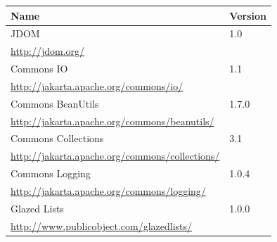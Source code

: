 \begin{table}[H]
 \centering
 \begin{tabular}{|l|l|}
  \hline
   \multicolumn{1}{|p{4.5in}|}{\bfseries{\textsf{Name}}} &
   \multicolumn{1}{|p{0.6in}|}{\bfseries{\textsf{Version}}} \\

  \hline
   \multicolumn{1}{|p{4.5in}|}{JDOM} &
   \multicolumn{1}{|p{0.6in}|}{1.0} \\
   \multicolumn{1}{|p{4.5in}|}{\footnotesize{\href{http://jdom.org/}{http://jdom.org/}}} &
   \multicolumn{1}{|p{0.6in}|}{} \\

  \hline
   \multicolumn{1}{|p{4.5in}|}{Commons IO} &
   \multicolumn{1}{|p{0.6in}|}{1.1} \\
   \multicolumn{1}{|p{4.5in}|}{\footnotesize{\href{http://jakarta.apache.org/commons/io/}{http://jakarta.apache.org/commons/io/}}} &
   \multicolumn{1}{|p{0.6in}|}{} \\

  \hline
   \multicolumn{1}{|p{4.5in}|}{Commons BeanUtils} &
   \multicolumn{1}{|p{0.6in}|}{1.7.0} \\
   \multicolumn{1}{|p{4.5in}|}{\footnotesize{\href{http://jakarta.apache.org/commons/beanutils/}{http://jakarta.apache.org/commons/beanutils/}}} &
   \multicolumn{1}{|p{0.6in}|}{} \\

  \hline
   \multicolumn{1}{|p{4.5in}|}{Commons Collections} &
   \multicolumn{1}{|p{0.6in}|}{3.1} \\
   \multicolumn{1}{|p{4.5in}|}{\footnotesize{\href{http://jakarta.apache.org/commons/collections/}{http://jakarta.apache.org/commons/collections/}}} &
   \multicolumn{1}{|p{0.6in}|}{} \\

  \hline
   \multicolumn{1}{|p{4.5in}|}{Commons Logging} &
   \multicolumn{1}{|p{0.6in}|}{1.0.4} \\
   \multicolumn{1}{|p{4.5in}|}{\footnotesize{\href{http://jakarta.apache.org/commons/logging/}{http://jakarta.apache.org/commons/logging/}}} &
   \multicolumn{1}{|p{0.6in}|}{} \\

  \hline
   \multicolumn{1}{|p{4.5in}|}{Glazed Lists} &
   \multicolumn{1}{|p{0.6in}|}{1.0.0} \\
   \multicolumn{1}{|p{4.5in}|}{\footnotesize{\href{http://www.publicobject.com/glazedlists/}{http://www.publicobject.com/glazedlists/}}} &
   \multicolumn{1}{|p{0.6in}|}{} \\


\end{tabular}
\end{table}
